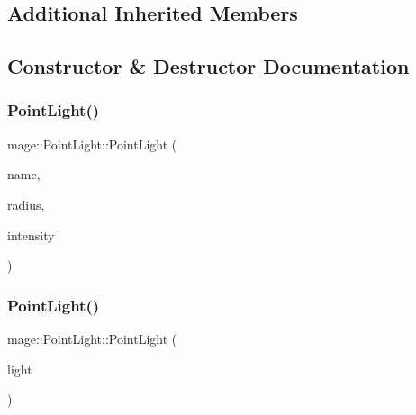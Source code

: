 \subsection*{Additional Inherited Members}


\subsection{Constructor \& Destructor Documentation}
\hypertarget{classmage_1_1_point_light_ac9d479055720799816d0489669cbd986}{}\label{classmage_1_1_point_light_ac9d479055720799816d0489669cbd986} 
\subsubsection{\texorpdfstring{Point\+Light()}{PointLight()}\hspace{0.1cm}{\footnotesize\ttfamily [1/3]}}
{\footnotesize\ttfamily mage\+::\+Point\+Light\+::\+Point\+Light (\begin{DoxyParamCaption}\item[{const string}]{name,  }\item[{float}]{radius,  }\item[{const \hyperlink{structmage_1_1_r_g_b_spectrum}{R\+G\+B\+Spectrum} \&}]{intensity }\end{DoxyParamCaption})}

\hypertarget{classmage_1_1_point_light_a0b0d5b110f1af47091ae682db7320c62}{}\label{classmage_1_1_point_light_a0b0d5b110f1af47091ae682db7320c62} 
\subsubsection{\texorpdfstring{Point\+Light()}{PointLight()}\hspace{0.1cm}{\footnotesize\ttfamily [2/3]}}
{\footnotesize\ttfamily mage\+::\+Point\+Light\+::\+Point\+Light (\begin{DoxyParamCaption}\item[{const \hyperlink{classmage_1_1_point_light}{Point\+Light} \&}]{light }\end{DoxyParamCaption})}

\hypertarget{classmage_1_1_point_light_a1268097d15effdebedcedada10a6f56a}{}\label{classmage_1_1_point_light_a1268097d15effdebedcedada10a6f56a} 
